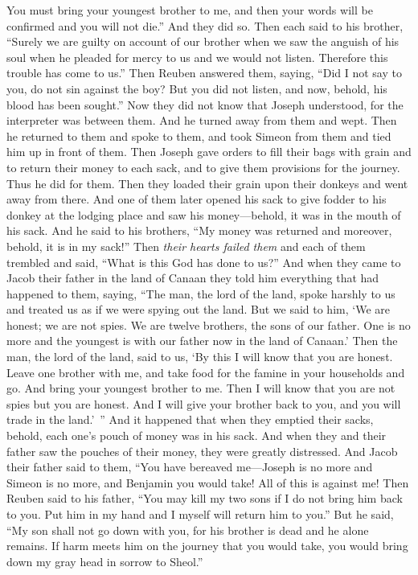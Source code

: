 \begin{biblechapter}
\verse You must bring your youngest brother to me, and then your words will be confirmed and you will not die.” And they did so.
\verse Then each said to his brother, “Surely we are guilty on account of our brother when we saw the anguish of his soul when he pleaded for mercy to us and we would not listen. Therefore this trouble has come to us.”
\verse Then Reuben answered them, saying, “Did I not say to you, do not sin against the boy? But you did not listen, and now, behold, his blood has been sought.”
\verse Now they did not know that Joseph understood, for the interpreter was between them.
\verse And he turned away from them and wept. Then he returned to them and spoke to them, and took Simeon from them and tied him up in front of them.
\verse Then Joseph gave orders to fill their bags with grain and to return their money to each sack, and to give them provisions for the journey. Thus he did for them.
\verse Then they loaded their grain upon their donkeys and went away from there.
\verse And one of them later opened his sack to give fodder to his donkey at the lodging place and saw his money—behold, it was in the mouth of his sack.
\verse And he said to his brothers, “My money was returned and moreover, behold, it is in my sack!” Then \textit{their hearts failed them} and each of them trembled and said, “What is this God has done to us?”
\verse And when they came to Jacob their father in the land of Canaan they told him everything that had happened to them, saying,
\verse “The man, the lord of the land, spoke harshly to us and treated us as if we were spying out the land.
\verse But we said to him, ‘We are honest; we are not spies.
\verse We are twelve brothers, the sons of our father. One is no more and the youngest is with our father now in the land of Canaan.’
\verse Then the man, the lord of the land, said to us, ‘By this I will know that you are honest. Leave one brother with me, and take food for the famine in your households and go.
\verse And bring your youngest brother to me. Then I will know that you are not spies but you are honest. And I will give your brother back to you, and you will trade in the land.’ ”
\verse And it happened that when they emptied their sacks, behold, each one’s pouch of money was in his sack. And when they and their father saw the pouches of their money, they were greatly distressed.
\verse And Jacob their father said to them, “You have bereaved me—Joseph is no more and Simeon is no more, and Benjamin you would take! All of this is against me!
\verse Then Reuben said to his father, “You may kill my two sons if I do not bring him back to you. Put him in my hand and I myself will return him to you.”
\verse But he said, “My son shall not go down with you, for his brother is dead and he alone remains. If harm meets him on the journey that you would take, you would bring down my gray head in sorrow to Sheol.”
\end{biblechapter}


